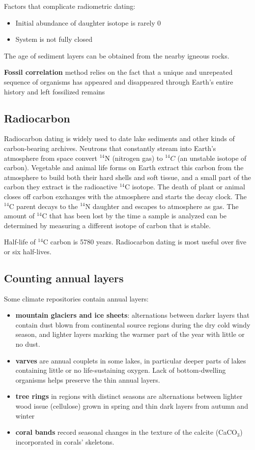 Factors that complicate radiometric dating:
\begin{itemize}
	\item Initial abundance of daughter isotope is rarely 0
	\item System is not fully closed
\end{itemize}

The age of sediment layers can be obtained from the nearby igneous rocks.

\textbf{Fossil correlation} method relies on the fact that a unique and
unrepeated sequence of organisms has appeared and disappeared through Earth's
entire history and left fossilized remains

\subsection{Radiocarbon}

Radiocarbon dating is widely used to date lake sediments and other kinds of
carbon-bearing archives. Neutrons that constantly stream into Earth's
atmosphere from space convert $^{14}$N (nitrogen gas) to $^{14}C$ (an
unstable isotope of carbon). Vegetable and animal life forms on Earth extract
this carbon from the atmosphere to build both their hard shells and soft
tissue, and a small part of the carbon they extract is the radioactive $^{14}$C
isotope. The death of plant or animal closes off carbon exchanges with the
atmosphere and starts the decay clock. The $^{14}$C parent decays to the
$^{14}$N daughter and escapes to atmosphere as gas. The amount of $^{14}$C
that has been lost by the time a sample is analyzed can be determined by
measuring a different isotope of carbon that is stable.

Half-life of $^{14}$C carbon is 5780 years. Radiocarbon dating is most useful
over five or six half-lives.

\subsection{Counting annual layers}
Some climate repositories contain annual layers:

\begin{itemize}
	\item \textbf{mountain glaciers and ice sheets}: alternations between
	darker layers that contain dust blown from continental source regions
	during the dry cold windy season, and lighter layers marking the
	warmer part of the year with little or no dust.
	\item \textbf{varves} are annual couplets in some lakes, in particular
	deeper parts of lakes containing little or no life-sustaining
	oxygen. Lack of bottom-dwelling organisms helps preserve the thin
	annual layers.
	\item \textbf{tree rings} in regions with distinct seasons are
	alternations between lighter wood issue (cellulose) grown in spring
	and thin dark layers from autumn and winter
	\item \textbf{coral bands} record seasonal changes in the texture
	of the calcite (CaCO$_3$) incorporated in corals' skeletons.
\end{itemize}


